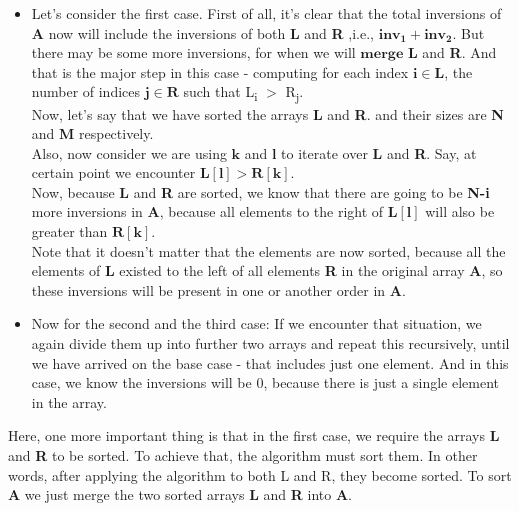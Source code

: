 \documentclass[conference]{IEEEtran}
\begin{document}
\begin{itemize}
    \item Let's consider the first case. First of all, it's clear that the total inversions of \textbf{A} now will include the inversions of both \textbf{L} and \textbf{R} ,i.e., $\bm{inv_1} + \bm{inv_2}$. But there may be some more inversions, for when we will $\bm{merge}$ \textbf{L} and \textbf{R}. And that is the major step in this case - computing for each index $\bm{i \in L}$, the number of indices $\bm{j \in R}$ such that L\textsubscript i $>$ R\textsubscript j.\\
    Now, let's say that we have sorted the arrays \textbf{L} and \textbf{R}. and their sizes are \textbf{N} and \textbf{M} respectively. \\
    Also, now consider we are using $\bm{k}$ and $\bm{l}$ to iterate over \textbf{L} and \textbf{R}. Say, at certain point we encounter $\bm{L[l]} > \bm{R[k]}$.\\
    Now, because \textbf{L} and \textbf{R} are sorted, we know that there are going to be \textbf{N-i} more inversions in \textbf{A}, because all elements to the right of $\bm{L[l]}$ will also be greater than $\bm{R[k]}$.\\
    Note that it doesn't matter that the elements are now sorted, because all the elements of \textbf{L} existed to the left of all elements \textbf{R} in the original array \textbf{A}, so these inversions will be present in one or another order in \textbf{A}.
    \\
    \item Now for the second and the third case: If we encounter that situation, we again divide them up into further two arrays and repeat this recursively, until we have arrived on the base case - that includes just one element. And in this case, we know the inversions will be $0$, because there is just a single element in the array.
\end{itemize}

Here, one more important thing is that in the first case, we require the arrays \textbf{L} and \textbf{R} to be sorted. To achieve that, the algorithm must sort them. In other words, after applying the algorithm to both L and R, they become sorted. To sort \textbf{A} we just merge the two sorted arrays \textbf{L} and \textbf{R} into \textbf{A}.
\end{document}

